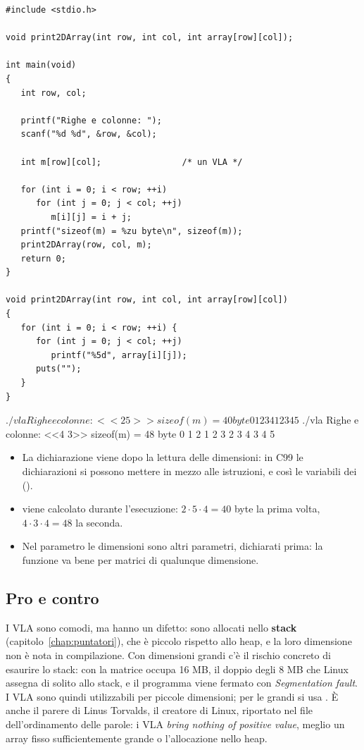 \begin{affianco}[0.55][c]
\begin{lstlisting}[style=c, name=vla.c]
#include <stdio.h>

void print2DArray(int row, int col, int array[row][col]);

int main(void)
{
   int row, col;

   printf("Righe e colonne: ");
   scanf("%d %d", &row, &col);

   int m[row][col];                /* un VLA */

   for (int i = 0; i < row; ++i)
      for (int j = 0; j < col; ++j)
         m[i][j] = i + j;
   printf("sizeof(m) = %zu byte\n", sizeof(m));
   print2DArray(row, col, m);
   return 0;
}

void print2DArray(int row, int col, int array[row][col])
{
   for (int i = 0; i < row; ++i) {
      for (int j = 0; j < col; ++j)
         printf("%5d", array[i][j]);
      puts("");
   }
}
\end{lstlisting}
\risultato
\begin{console}
$ ./vla
Righe e colonne: <<2 5>>
sizeof(m) = 40 byte
    0    1    2    3    4
    1    2    3    4    5
$ ./vla
Righe e colonne: <<4 3>>
sizeof(m) = 48 byte
    0    1    2
    1    2    3
    2    3    4
    3    4    5
\end{console}
\end{affianco}

\begin{itemize}
  \item La dichiarazione  viene dopo la lettura delle
        dimensioni: in C99 le dichiarazioni si possono mettere in mezzo alle
        istruzioni, e così le variabili dei 
        ().
  \item {} viene calcolato durante l'esecuzione: $2 \cdot 5
        \cdot 4 = 40$ byte la prima volta, $4 \cdot 3 \cdot 4 = 48$ la
        seconda.
  \item Nel parametro  le dimensioni sono altri
        parametri, dichiarati prima: la funzione va bene per matrici di
        qualunque dimensione.
\end{itemize}

\subsection{Pro e contro}

I VLA sono comodi, ma hanno un difetto: sono allocati nello
\textbf{stack} (capitolo~\ref{chap:puntatori}), che è piccolo rispetto allo
heap, e la loro dimensione non è nota in compilazione. Con dimensioni grandi
c'è il rischio concreto di esaurire lo stack: con  la matrice
occupa 16 MB, il doppio degli 8 MB che Linux assegna di solito allo stack, e
il programma viene fermato con \textit{Segmentation fault}. I VLA sono
quindi utilizzabili per piccole dimensioni; per le grandi si usa
. È anche il parere di Linus Torvalds, il creatore di Linux,
riportato nel file  dell'ordinamento delle parole: i VLA
\textit{bring nothing of positive value}, meglio un array fisso
sufficientemente grande o l'allocazione nello heap.

